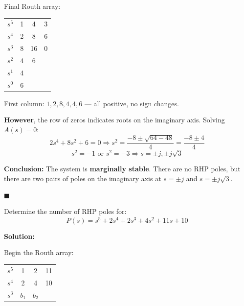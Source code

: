 Final Routh array:
\begin{center}
\begin{tabular}{c|ccc}
\toprule
$s^5$ & 1 & 4 & 3 \\
$s^4$ & 2 & 8 & 6 \\
$s^3$ & 8 & 16 & 0 \\
$s^2$ & 4 & 6 & \\
$s^1$ & 4 & & \\
$s^0$ & 6 & & \\
\bottomrule
\end{tabular}
\end{center}

First column: $1, 2, 8, 4, 4, 6$ --- all positive, no sign changes.

\textbf{However}, the row of zeros indicates roots on the imaginary axis. Solving $A(s) = 0$:
\begin{equation*}
2s^4 + 8s^2 + 6 = 0 \Rightarrow s^2 = \frac{-8 \pm \sqrt{64-48}}{4} = \frac{-8 \pm 4}{4}
\end{equation*}
\begin{equation*}
s^2 = -1 \text{ or } s^2 = -3 \Rightarrow s = \pm j, \pm j\sqrt{3}
\end{equation*}

\textbf{Conclusion:} The system is \textbf{marginally stable}. There are no RHP poles, but there are two pairs of poles on the imaginary axis at $s = \pm j$ and $s = \pm j\sqrt{3}$.

\hfill $\blacksquare$

\vspace{1em}

\begin{example}
\label{ex:zero_first_column}
Determine the number of RHP poles for:
\begin{equation*}
P(s) = s^5 + 2s^4 + 2s^3 + 4s^2 + 11s + 10
\end{equation*}
\end{example}

\textbf{Solution:}

Begin the Routh array:
\begin{center}
\begin{tabular}{c|ccc}
\toprule
$s^5$ & 1 & 2 & 11 \\
$s^4$ & 2 & 4 & 10 \\
$s^3$ & $b_1$ & $b_2$ & \\
\bottomrule
\end{tabular}
\end{center}

